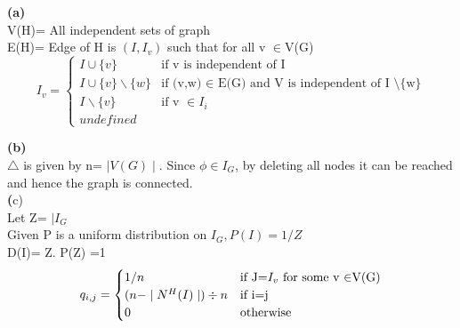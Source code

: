 \textbf{(a)}\\
 V(H)= All independent sets of graph \\
E(H)= Edge of H is $(I,I_{v})$ such that for all v $\in $V(G)  \\
\[
  I_{v} =
  \begin{cases}
                                   I \cup \{v\} & \text{if v is independent of I} \\
                                   I \cup \{v\} \backslash \{w\} & \text{if (v,w) $\in$ E(G) and V is independent of  I \textbackslash \{w\}} \\
  				I \backslash \{v\}  & \text{if v $\in I_{i}$ }\\
				undefined 
  \end{cases}
\]



\textbf{(b)}\\ $\triangle$ is given by n= $\mid V(G) \mid $. Since $\phi \in I_{G}$, by deleting all nodes it can be reached and hence the graph is connected. \\

\textbf(c)\\
 Let Z= $\mid I_{G}$ \\
Given P is a uniform distribution on $I_{G}, P(I)=1/Z $\\
D(I)= Z. P(Z) =1 \\
\[
 q_{i,j} =
  \begin{cases}
                                   1/n & \text{if J=$ I_{v}$ for some v $\in $V(G)} \\
                                   (n- \mid N^{H}(I)\mid) \div n & \text{if i=j} \\
  			0  & \text{otherwise}
  \end{cases}
\]
